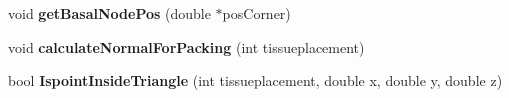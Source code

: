\begin{DoxyCompactItemize}
\item 
\hypertarget{classTriangle_a58817fb4e1f91fd6e856dd3b12f3ee82}{}void {\bfseries get\+Basal\+Node\+Pos} (double $\ast$pos\+Corner)\label{classTriangle_a58817fb4e1f91fd6e856dd3b12f3ee82}

\item 
\hypertarget{classTriangle_a372f2cdcbcc45b6e3935ae48a2dca266}{}void {\bfseries calculate\+Normal\+For\+Packing} (int tissueplacement)\label{classTriangle_a372f2cdcbcc45b6e3935ae48a2dca266}

\item 
\hypertarget{classTriangle_acf12a63ea288e0f97e17ff49ebd44ba5}{}bool {\bfseries Ispoint\+Inside\+Triangle} (int tissueplacement, double x, double y, double z)\label{classTriangle_acf12a63ea288e0f97e17ff49ebd44ba5}

\end{DoxyCompactItemize}
